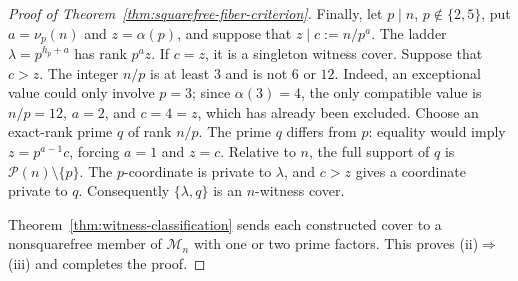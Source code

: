 \begin{proof}[Proof of Theorem~\ref{thm:squarefree-fiber-criterion}]
Finally, let $p\mid n$, $p\notin\{2,5\}$, put $a=\nu_p(n)$ and
$z=\alpha(p)$, and suppose that $z\mid c:=n/p^a$.  The ladder
$\lambda=p^{h_p+a}$ has rank $p^az$.  If $c=z$, it is a singleton witness
cover.  Suppose that $c>z$.  The integer $n/p$ is at least $3$ and is not
$6$ or $12$.  Indeed, an exceptional value could only involve $p=3$; since
$\alpha(3)=4$, the only compatible value is $n/p=12$, $a=2$, and $c=4=z$,
which has already been excluded.  Choose an exact-rank prime $q$ of rank
$n/p$.  The prime $q$ differs from $p$: equality would imply
$z=p^{a-1}c$, forcing $a=1$ and $z=c$.  Relative to $n$, the full support of
$q$ is $\mathcal P(n)\setminus\{p\}$.  The $p$-coordinate is private to
$\lambda$, and $c>z$ gives a coordinate private to $q$.  Consequently
$\{\lambda,q\}$ is an $n$-witness cover.

Theorem~\ref{thm:witness-classification} sends each constructed cover to a
nonsquarefree member of $\mathcal M_n$ with one or two prime factors.  This
proves \textup{(ii)}$\Rightarrow$\textup{(iii)} and completes the proof.
\end{proof}
